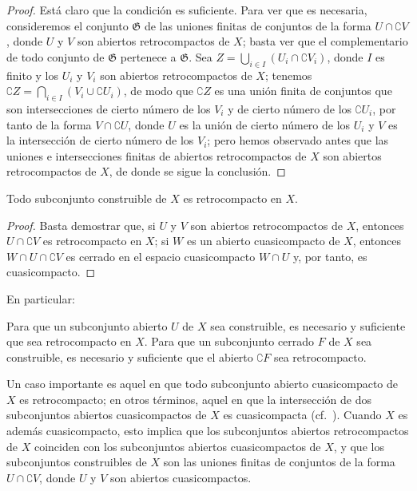 \documentclass[oneside]{amsart}
\newcommand{\oldpage}[2][]{{\marginnote{\normalfont\textbf{#1}~|~#2}}\ignorespaces}
\let\EGAOriginalLabel\label
\renewcommand{\label}[1]{\phantomsection\EGAOriginalLabel{#1}}
\begin{document}
\begin{proof}
Está claro que la condición es suficiente.
Para ver que es necesaria, consideremos el conjunto $\mathfrak{G}$ de las uniones finitas de conjuntos de la forma $U\cap\complement{V}$, donde $U$ y $V$ son abiertos retrocompactos de $X$; basta ver que el complementario de todo conjunto de $\mathfrak{G}$ pertenece a $\mathfrak{G}$.
Sea $Z=\bigcup_{i\in I}(U_i\cap\complement{V_i})$, donde $I$ es finito y los $U_i$ y $V_i$ son abiertos retrocompactos de $X$; tenemos
$\complement{Z}=\bigcap_{i\in I}(V_i\cup\complement{U_i})$, de modo que $\complement{Z}$ es una unión finita de conjuntos que son intersecciones de cierto número de los $V_i$ y de cierto número de los $\complement{U_i}$, por tanto de la forma
\oldpage[0\textsubscript{III}]{13}
$V\cap\complement{U}$, donde $U$ es la unión de cierto número de los $U_i$ y $V$ es la intersección de cierto número de los $V_i$; pero hemos observado antes que las uniones e intersecciones finitas de abiertos retrocompactos de $X$ son abiertos retrocompactos de $X$, de donde se sigue la conclusión.
\end{proof}

\begin{corollary}[9.1.4]
\label{0.9.1.4}
Todo subconjunto construible de $X$ es retrocompacto en $X$.
\end{corollary}

\begin{proof}
Basta demostrar que, si $U$ y $V$ son abiertos retrocompactos de $X$, entonces $U\cap\complement{V}$ es retrocompacto en $X$; si $W$ es un abierto cuasicompacto de $X$, entonces $W\cap U\cap\complement{V}$ es cerrado en el espacio cuasicompacto $W\cap U$ y, por tanto, es cuasicompacto.
\end{proof}

En particular:
\begin{corollary}[9.1.5]
\label{0.9.1.5}
Para que un subconjunto abierto $U$ de $X$ sea construible, es necesario y suficiente que sea retrocompacto en $X$.
Para que un subconjunto cerrado $F$ de $X$ sea construible, es necesario y suficiente que el abierto $\complement{F}$ sea retrocompacto.
\end{corollary}

\begin{env}[9.1.6]
\label{0.9.1.6}
Un caso importante es aquel en que todo subconjunto abierto cuasicompacto de $X$ es retrocompacto; en otros términos, aquel en que la intersección de dos subconjuntos abiertos cuasicompactos de $X$ es cuasicompacta (cf.~).
Cuando $X$ es además cuasicompacto, esto implica que los subconjuntos abiertos retrocompactos de $X$ coinciden con los subconjuntos abiertos cuasicompactos de $X$, y que los subconjuntos construibles de $X$ son las uniones finitas de conjuntos de la forma $U\cap\complement{V}$, donde $U$ y $V$ son abiertos cuasicompactos.
\end{env}
\end{document}
